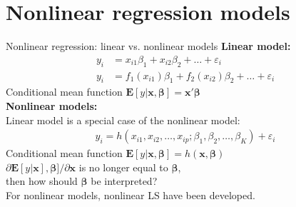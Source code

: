 \documentclass{beamer}
\begin{document}
\section{Nonlinear regression models}
\begin{frame}{Nonlinear regression: linear vs. nonlinear models}
\textbf{Linear model:}
\begin{align*}
y_i & = x_{i1}\beta_1 + x_{i2} \beta_2 + \dots + \varepsilon_i \\
y_i & = f_1(x_{i1}) \beta_1 + f_2(x_{i2}) \beta_2 + \dots + \varepsilon_i
\end{align*}
Conditional mean function $\mathbf{E}[y|\bm{x},\bm{\beta}]= \bm{x}'\bm{\beta}$
\\
\vspace{0.5cm}
\textbf{Nonlinear models:}\\
Linear model is a special case of the nonlinear model: 
\begin{align*}
y_i=h(x_{i1}, x_{i2}, \dots, x_{ip};\beta_1,\beta_2,\dots,\beta_K)+\varepsilon_i
\end{align*}
Conditional mean function $\mathbf{E}[y|\bm{x},\bm{\beta}]= h(\bm{x},\bm{\beta})$\\
$\partial\mathbf{E}[y|\bm{x}],\bm{\beta}]/\partial \bm{x}$ is no longer equal to $\bm\beta$, \\ then how should $\bm\beta$ be interpreted?\\
\vspace{0.2cm}
For nonlinear models, nonlinear LS have been developed.
\end{frame}
\end{document}
